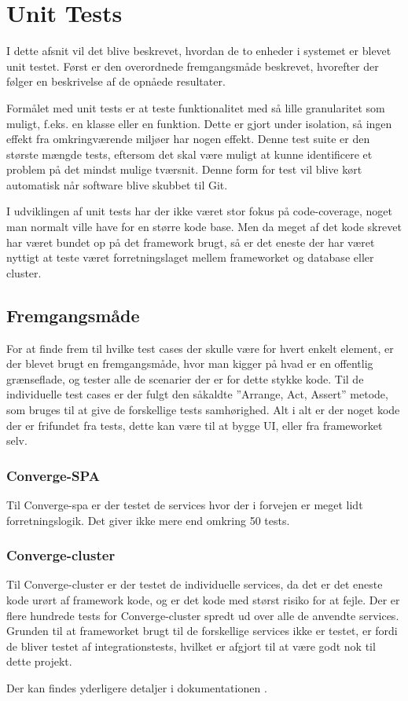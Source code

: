 
\section{Unit Tests}

I dette afsnit vil det blive beskrevet, hvordan de to enheder i systemet er blevet unit testet. Først er den overordnede fremgangsmåde beskrevet, hvorefter der følger en beskrivelse af de opnåede resultater. 

Formålet med unit tests er at teste funktionalitet med så lille granularitet som muligt, f.eks. en klasse eller en funktion. Dette er gjort under isolation, så ingen effekt fra omkringværende miljøer har nogen effekt. Denne test suite er den største mængde tests, eftersom det skal være muligt at kunne identificere et problem på det mindst mulige tværsnit. Denne form for test vil blive kørt automatisk når software blive skubbet til Git.

I udviklingen af unit tests har der ikke været stor fokus på code-coverage, noget man normalt ville have for en større kode base. Men da meget af det kode skrevet har været bundet op på det framework brugt, så er det eneste der har været nyttigt at teste været forretningslaget mellem frameworket og database eller cluster.


\subsection{Fremgangsmåde}

For at finde frem til hvilke test cases der skulle være for hvert enkelt element, er der blevet brugt en fremgangsmåde, hvor man kigger på hvad er en offentlig grænseflade, og tester alle de scenarier der er for dette stykke kode. Til de individuelle test cases er der fulgt den såkaldte ''Arrange, Act, Assert'' \cite{Arrange-Act-Assert} metode, som bruges til at give de forskellige tests samhørighed. Alt i alt er der noget kode der er frifundet fra tests, dette kan være til at bygge UI, eller fra frameworket selv.


\subsubsection{Converge-SPA}

Til Converge-spa er der testet de services hvor der i forvejen er meget lidt forretningslogik. Det giver ikke mere end omkring 50 tests.

\subsubsection{Converge-cluster}

Til Converge-cluster er der testet de individuelle services, da det er det eneste kode urørt af framework kode, og er det kode med størst risiko for at fejle. Der er flere hundrede tests for Converge-cluster spredt ud over alle de anvendte services. Grunden til at frameworket brugt til de forskellige services ikke er testet, er fordi de bliver testet af integrationstests, hvilket er afgjort til at være godt nok til dette projekt.

Der kan findes yderligere detaljer i dokumentationen \cite{unit-test}.